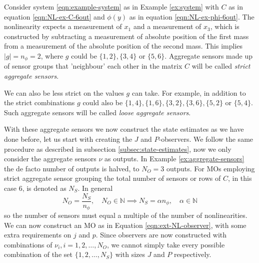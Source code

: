 \begin{example}\label{ex:aggregate-sensors}
    Consider system \eqref{eqn:example-system} as in Example \ref{ex:system} with $C$ as in equation \eqref{eqn:NL-ex-C-6out} and $\phi(y)$ as in equation \eqref{eqn:NL-ex-phi-6out}. The nonlinearity expects a measurement of $x_1$ and a measurement of $x_3$, which is constructed by subtracting a measurement of absolute position of the first mass from a measurement of the absolute position of the second mass. This implies $|g|=n_{\phi}=2$, where $g$ could be $\{1,2\},\{3,4\}$ or $\{5,6\}$. Aggregate sensors made up of sensor groups that 'neighbour' each other in the matrix $C$ will be called \textit{strict aggregate sensors}.

    We can also be less strict on the values $g$ can take. For example, in addition to the strict combinations $g$ could also be $\{1,4\},\{1,6\},\{3,2\},\{3,6\},\{5,2\}$ or $\{5,4\}$. Such aggregate sensors will be called \textit{loose aggregate sensors}.
\end{example}

With these aggregate sensors we now construct the state estimates as we have done before, let us start with creating the $J$ and $P$-observers. We follow the same procedure as described in subsection \ref{subsec:state-estimates}, now we only consider the aggregate sensors $\nu$ as outputs. In Example \eqref{ex:aggregate-sensors} the de facto number of outputs is halved, to $N_O=3$ outputs. For MOs employing strict aggregate sensor grouping the total number of sensors or rows of $C$, in this case $6$, is denoted as $N_S$. In general
\begin{equation*}
    N_O = \frac{N_S}{n_{\phi}}, \quad N_O \in \mathbb{N} \implies N_S = \alpha n_{\phi}, \quad \alpha \in \mathbb{N}
\end{equation*}
so the number of sensors must equal a multiple of the number of nonlinearities. We can now construct an MO as in Equation \eqref{eqn:ext-NL-observer}, with some extra requirements on $j$ and $p$. Since observers are now constructed with combinations of $\nu_i,i=1,2,\dots,N_O$, we cannot simply take every possible combination of the set $\{1,2,\dots,N_S\}$ with sizes $J$ and $P$ respectively. 

